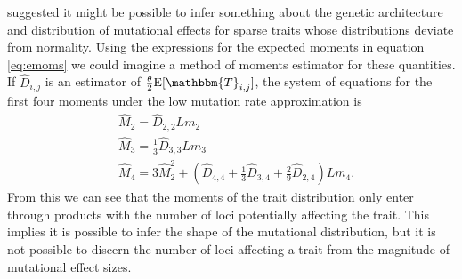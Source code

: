 \citet{Schraiber2015} suggested it might be possible to infer something about
the genetic architecture and distribution of mutational effects for sparse
traits whose distributions deviate from normality. Using the expressions for the
expected moments in equation \eqref{eq:emoms} we could imagine a method of moments
estimator for these quantities. If $\hat{D}_{i,j}$ is an estimator of
$\T \E[\mathbbm{T}_{i,j}]$, the system of equations for the first four moments under the
low mutation rate approximation is
\begin{align}
  &\hat{M}_2 = \hat{D}_{2,2}Lm_2 \nonumber \\
  &\hat{M}_3 = \frac{1}{3}\hat{D}_{3,3}Lm_3 \nonumber \\
  &\hat{M}_4 = 3\hat{M}_2^2 + (\hat{D}_{4,4} + \frac{1}{3} \hat{D}_{3,4} + \frac{2}{9} \hat{D}_{2,4})Lm_4.
\end{align}
From this we can see that the moments of the trait distribution only enter
through products with the number of loci potentially affecting the trait. This
implies it is possible to infer the shape of the mutational distribution, but it
is not possible to discern the number of loci affecting a trait from the
magnitude of mutational effect sizes.

